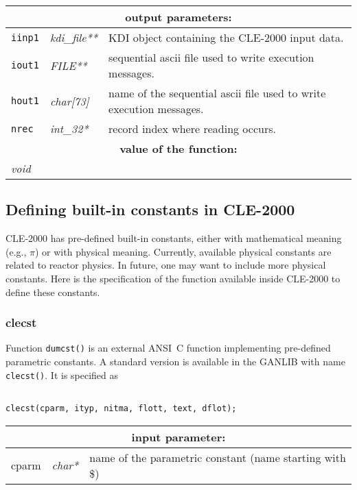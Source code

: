 \noindent
\begin{tabular}{|p{1.5cm}|p{2cm}|p{11cm}|}
\hline
\multicolumn{3}{|c|}{\bf output parameters:} \\
\hline
{\tt iinp1} & {\it kdi\_file**} & KDI object containing the CLE-2000 input data.\\
\hline
{\tt iout1} & {\it FILE**} & sequential {\sc ascii} file used to write execution messages. \\
\hline
{\tt hout1} & {\it char[73]} & name of the sequential {\sc ascii} file used to write execution messages. \\
\hline
{\tt nrec} & {\it int\_32*} & record index where reading occurs. \\
\hline
\multicolumn{3}{|c|}{\bf value of the function:} \\
\hline
\multicolumn{2}{|l|}{\it void} &  \\
\hline
\end{tabular}

\subsection{Defining built-in constants in CLE-2000}

CLE-2000 has pre-defined built-in constants, either with mathematical meaning (e.g., $\pi$) or with physical meaning. Currently, available physical constants are
related to reactor physics. In future, one may want to include more physical constants. Here is the specification of the function available inside CLE-2000 to define these constants.

\subsubsection{clecst}

Function {\tt dumcst()} is an external ANSI~C function implementing pre-defined parametric constants. A standard version is available in the GANLIB with name {\tt clecst()}. It is specified as
\begin{verbatim}

clecst(cparm, ityp, nitma, flott, text, dflot);
\end{verbatim}

\vskip 0.8cm

\noindent
\begin{tabular}{|p{1.5cm}|p{2cm}|p{11cm}|}
\hline
\multicolumn{3}{|c|}{\bf input parameter:} \\
\hline
cparm & {\it char*} & name of the parametric constant (name starting with \$) \\
\hline
\end{tabular}

